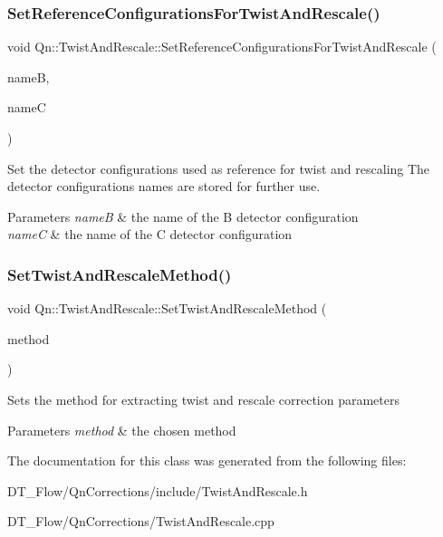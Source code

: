 \subsubsection{\texorpdfstring{Set\+Reference\+Configurations\+For\+Twist\+And\+Rescale()}{SetReferenceConfigurationsForTwistAndRescale()}}
{\footnotesize\ttfamily void Qn\+::\+Twist\+And\+Rescale\+::\+Set\+Reference\+Configurations\+For\+Twist\+And\+Rescale (\begin{DoxyParamCaption}\item[{const char $\ast$}]{nameB,  }\item[{const char $\ast$}]{nameC }\end{DoxyParamCaption})}

Set the detector configurations used as reference for twist and rescaling The detector configurations names are stored for further use. 
\begin{DoxyParams}{Parameters}
{\em nameB} & the name of the B detector configuration \\
\hline
{\em nameC} & the name of the C detector configuration \\
\hline
\end{DoxyParams}
\mbox{\label{classQn_1_1TwistAndRescale_ab7a17c1330ba109472e4941ba44c3ad5}} 
\subsubsection{\texorpdfstring{Set\+Twist\+And\+Rescale\+Method()}{SetTwistAndRescaleMethod()}}
{\footnotesize\ttfamily void Qn\+::\+Twist\+And\+Rescale\+::\+Set\+Twist\+And\+Rescale\+Method (\begin{DoxyParamCaption}\item[{\mbox{\hyperlink{classQn_1_1TwistAndRescale_a04bae5b47174d3536e1f6ac8499b982f}{Qn\+Twist\+And\+Rescale\+Method}}}]{method }\end{DoxyParamCaption})\hspace{0.3cm}{\ttfamily [inline]}}

Sets the method for extracting twist and rescale correction parameters 
\begin{DoxyParams}{Parameters}
{\em method} & the chosen method \\
\hline
\end{DoxyParams}


The documentation for this class was generated from the following files\+:\begin{DoxyCompactItemize}
\item 
D\+T\+\_\+\+Flow/\+Qn\+Corrections/include/Twist\+And\+Rescale.\+h\item 
D\+T\+\_\+\+Flow/\+Qn\+Corrections/Twist\+And\+Rescale.\+cpp\end{DoxyCompactItemize}
